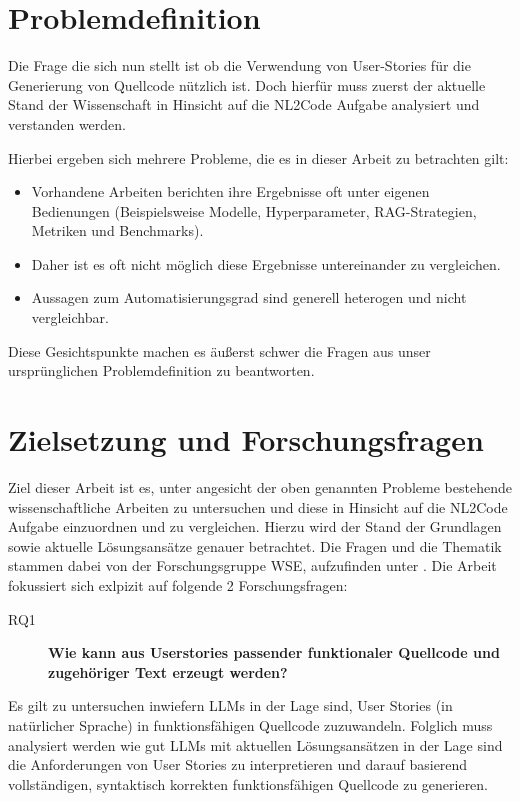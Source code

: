 \section{Problemdefinition}\label{ch:Problemdefinition}

Die Frage die sich nun stellt ist ob die Verwendung von User-Stories für die Generierung von Quellcode nützlich ist. Doch hierfür muss zuerst der aktuelle Stand der Wissenschaft in Hinsicht auf die NL2Code Aufgabe analysiert und verstanden werden.

Hierbei ergeben sich mehrere Probleme, die es in dieser Arbeit zu betrachten gilt:

\begin{itemize}
    \item Vorhandene Arbeiten berichten ihre Ergebnisse oft unter eigenen Bedienungen (Beispielsweise Modelle, Hyperparameter, RAG-Strategien, Metriken und Benchmarks).
    \item Daher ist es oft nicht möglich diese Ergebnisse untereinander zu vergleichen.
    \item Aussagen zum Automatisierungsgrad sind generell heterogen und nicht vergleichbar.
\end{itemize}

Diese Gesichtspunkte machen es äußerst schwer die Fragen aus unser ursprünglichen Problemdefinition zu beantworten.

\section{Zielsetzung und Forschungsfragen}\label{ch:Zielsetzung und Forschungsfragen}

Ziel dieser Arbeit ist es, unter angesicht der oben genannten Probleme bestehende wissenschaftliche Arbeiten zu untersuchen und diese in Hinsicht auf die NL2Code Aufgabe einzuordnen und zu vergleichen. Hierzu wird der Stand der Grundlagen sowie aktuelle Lösungsansätze genauer betrachtet. Die Fragen und die Thematik stammen dabei von der Forschungsgruppe WSE, aufzufinden unter \cite{WSEResearchThema}. Die Arbeit fokussiert sich exlpizit auf folgende 2 Forschungsfragen:

\begin{description}
    \item[RQ1]\label{RQ1} \textbf{Wie kann aus Userstories passender funktionaler Quellcode und zugehöriger Text erzeugt werden?}
\end{description}

Es gilt zu untersuchen inwiefern LLMs in der Lage sind, User Stories (in natürlicher Sprache) in funktionsfähigen Quellcode zuzuwandeln. Folglich muss analysiert werden wie gut LLMs mit aktuellen Lösungsansätzen in der Lage sind die Anforderungen von User Stories zu interpretieren und darauf basierend vollständigen, syntaktisch korrekten funktionsfähigen Quellcode zu generieren.


